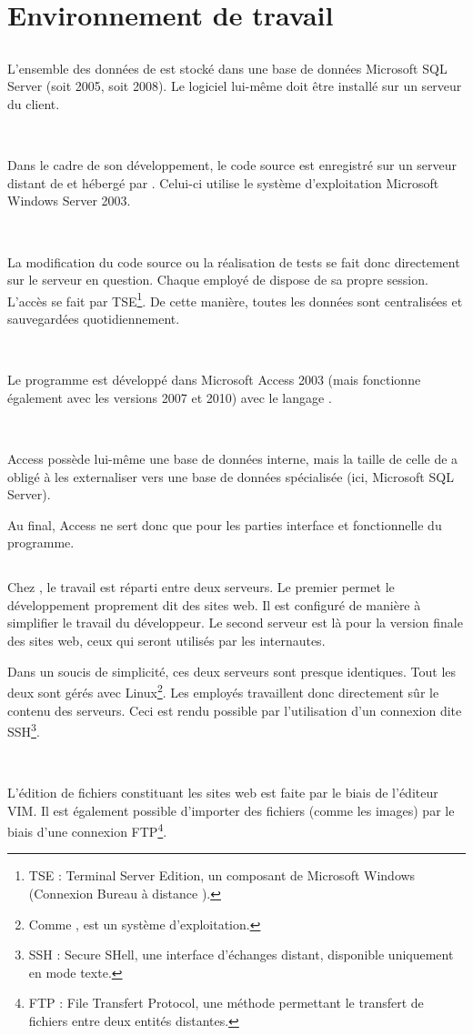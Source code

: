 \chapter{Environnement de travail}
\section{\solulog}
L'ensemble des données de \integrale{} est stocké dans une base de données Microsoft SQL Server (soit 2005, soit 2008). Le logiciel lui-même doit être installé sur un serveur du client.

~

Dans le cadre de son développement, le code source est enregistré sur un serveur distant de \solulog{} et hébergé par \fidit. Celui-ci utilise le système d'exploitation Microsoft Windows Server 2003.

~

La modification du code source ou la réalisation de tests se fait donc directement sur le serveur en question. Chaque employé de \solulog{} dispose de sa propre session. L'accès se fait par TSE\footnote{TSE : Terminal Server Edition, un composant de Microsoft Windows (\og Connexion Bureau à distance \fg).}. De cette manière, toutes les données sont centralisées et sauvegardées quotidiennement.

~

Le programme \integrale{} est développé dans Microsoft Access 2003 (mais fonctionne également avec les versions 2007 et 2010) avec le langage \vb.

~

Access possède lui-même une base de données interne, mais la taille de celle de \integrale{} a obligé \solulog{} à les externaliser vers une base de données spécialisée (ici, Microsoft SQL Server).

Au final, Access ne sert donc que pour les parties interface et fonctionnelle du programme.

\section{\fidit}
Chez \fidit, le travail est réparti entre deux serveurs. Le premier permet le développement proprement dit des sites web. Il est configuré de manière à simplifier le travail du développeur. Le second serveur est là pour la version \og finale \fg{} des sites web, ceux qui seront utilisés par les internautes.

Dans un soucis de simplicité, ces deux serveurs sont presque identiques. Tout les deux sont gérés avec Linux\footnote{Comme ,  est un système d'exploitation.}. Les employés travaillent donc directement sûr le contenu des serveurs. Ceci est rendu possible par l'utilisation d'un connexion dite SSH\footnote{SSH : Secure SHell, une interface d'échanges distant, disponible uniquement en mode texte.}.

~

L'édition de fichiers constituant les sites web est faite par le biais de l'éditeur VIM. Il est également possible d'importer des fichiers (comme les images) par le biais d'une connexion FTP\footnote{FTP : File Transfert Protocol, une méthode permettant le transfert de fichiers entre deux entités distantes.}.
